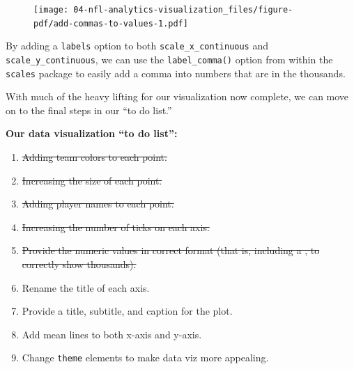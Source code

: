 \documentclass[
  letterpaper,
]{krantz}
\begin{document}
\begin{figure}[H]

{\centering \texttt{[image: 04-nfl-analytics-visualization\_files/figure-pdf/add-commas-to-values-1.pdf]}

}

\end{figure}

By adding a \texttt{labels} option to both \texttt{scale\_x\_continuous}
and \texttt{scale\_y\_continuous}, we can use the
\texttt{label\_comma()} option from within the \texttt{scales} package
to easily add a comma into numbers that are in the thousands.

With much of the heavy lifting for our visualization now complete, we
can move on to the final steps in our ``to do list.''

\begin{tcolorbox}[enhanced jigsaw, colback=white, leftrule=.75mm, breakable, colframe=quarto-callout-note-color-frame, bottomtitle=1mm, rightrule=.15mm, left=2mm, opacityback=0, bottomrule=.15mm, arc=.35mm, coltitle=black, colbacktitle=quarto-callout-note-color!10!white, toptitle=1mm, titlerule=0mm, title=\textcolor{quarto-callout-note-color}{\faInfo}\hspace{0.5em}{Note}, toprule=.15mm, opacitybacktitle=0.6]

\textbf{Our data visualization ``to do list'':}

\begin{enumerate}
\def\labelenumi{\arabic{enumi}.}
\item
  \st{Adding team colors to each point.}
\item
  \st{Increasing the size of each point.}
\item
  \st{Adding player names to each point.}
\item
  \st{Increasing the number of ticks on each axis.}
\item
  \st{Provide the numeric values in correct format (that is, including a
  , to correctly show thousands).}
\item
  Rename the title of each axis.
\item
  Provide a title, subtitle, and caption for the plot.
\item
  Add mean lines to both x-axis and y-axis.
\item
  Change \texttt{theme} elements to make data viz more appealing.
\end{enumerate}

\end{tcolorbox}
\end{document}
